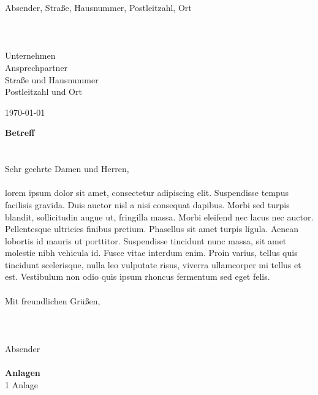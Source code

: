 \documentclass[a4paper,11pt]{letter}
\begin{document}
\noindent
\parbox[t][45mm]{120mm}{
  {\footnotesize Absender, Straße, Hausnummer, Postleitzahl, Ort}\\
  \\
  \\
  \\
  Unternehmen\\
  Ansprechpartner\\
  Straße und Hausnummer\\
  Postleitzahl und Ort\\
}

\hspace{142,5mm}
\parbox[t]{50mm}{
  \vspace{12,5mm}
  \germandate\today
}
\parbox[t]{165mm}{
\vspace{5mm}
\textbf{Betreff}\\
\\
\\
Sehr geehrte Damen und Herren,\\
\\
lorem ipsum dolor sit amet, consectetur adipiscing elit. Suspendisse tempus facilisis gravida. Duis auctor nisl a nisi consequat dapibus. Morbi sed 
turpis blandit, sollicitudin augue ut, fringilla massa. Morbi eleifend nec lacus nec auctor. Pellentesque ultricies finibus pretium. Phasellus sit 
amet turpis ligula. Aenean lobortis id mauris ut porttitor. Suspendisse tincidunt nunc massa, sit amet molestie nibh vehicula id. Fusce vitae interdum 
enim. Proin varius, tellus quis tincidunt scelerisque, nulla leo vulputate risus, viverra ullamcorper mi tellus et est. Vestibulum non odio quis ipsum 
rhoncus fermentum sed eget felis. \\
\\
Mit freundlichen Grüßen,\\
\\
\\
\\
Absender\\
\\
\textbf{Anlagen}\\
1 Anlage
}
\end{document}
